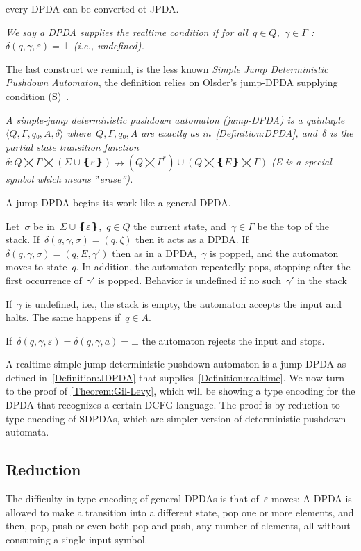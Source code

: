 every DPDA can be converted ot JPDA.
\begin{Definition}
  \label{Definition:realtime}
  \slshape
We say a DPDA supplies the \emph{realtime condition} if
  for all~$q∈Q$,~$γ∈Γ$ :~$δ(q,γ,ε)=⊥$ (i.e., undefined).
\end{Definition}

The last construct we remind, is the less known \emph{Simple Jump Deterministic Pushdown Automaton},
the definition relies on Olsder's jump-DPDA supplying condition (S)~\cite{Courcelle:77}.

\begin{Definition}
  \label{Definition:JDPDA}
  \slshape
  A \emph{simple-jump deterministic pushdown automaton} (jump-DPDA) is a quintuple~$⟨Q,Γ,q₀,A,δ⟩$
  where~$Q,Γ,q₀,A$ are exactly as in~\cref{Definition:DPDA},
  and~$δ$ is the
  \emph{partial state transition function}~$δ:Q⨉Γ⨉(Σ∪❴ε❵)↛(Q⨉Γ^*)∪(Q⨉❴E❵⨉Γ)$
  (E is a special symbol which means ‟erase”).
  \par
  A jump-DPDA begins its work like a general DPDA\@.
  \par
  Let~$σ$ be in~$Σ∪❴ε❵$,~$q∈Q$ the current state, and~$γ∈Γ$ be the top of the stack.
  If~$δ(q,γ,σ)=(q,ζ)$ then it acts as a DPDA\@.
  If~$δ(q,γ,σ)=(q,E,γ')$ then as in a DPDA,~$γ$ is popped, and the automaton
  moves to state~$q$. 
  In addition, the automaton repeatedly pops, stopping after the first occurrence of~$γ'$ is popped.
  Behavior is undefined if no such~$γ'$ in the stack 
  \par
  If~$γ$ is undefined, i.e., the stack is empty, the automaton accepts the input and halts.
  The same happens if~$q∈A$.
  \par
  If~$δ(q,γ,ε)=δ(q,γ,a)=⊥$ the automaton rejects the input and stops.
\end{Definition}

A realtime simple-jump deterministic pushdown automaton is a jump-DPDA
  as defined in~\cref{Definition:JDPDA}
  that supplies~\cref{Definition:realtime}.
We now turn to the proof of \cref{Theorem:Gil-Levy}, which will be showing a type encoding for the DPDA that recognizes a certain DCFG language.
The proof is by reduction to type encoding of SDPDAs, which are simpler version of deterministic pushdown automata.

\subsection{Reduction}
The difficulty in type-encoding of general DPDAs is that of~$ε$-moves:
A DPDA is allowed to make a transition into a different state,
  pop one or more elements, and then, pop, push or even both pop and push, any number of elements,
  all without consuming a single input symbol.

